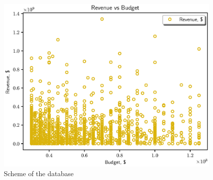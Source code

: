 \documentclass{article}
\begin{document}
\begin{figure}[htp]
   \includegraphics{revenue_budget.eps}
   \caption{Scheme of the database}
   \label{fig:db}
\end{figure}
\end{document}
